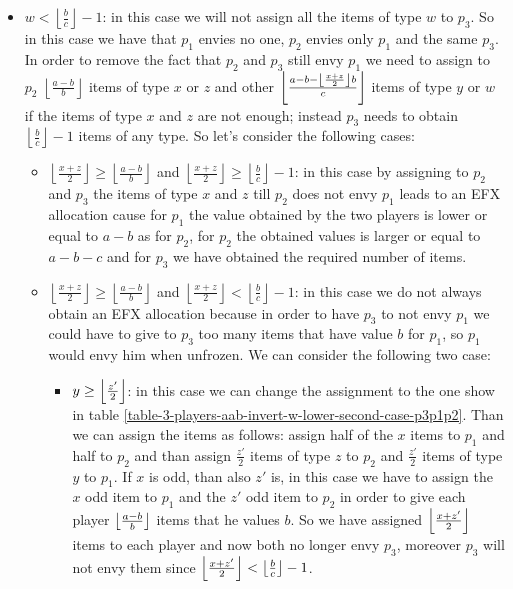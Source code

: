 \begin{itemize}
    \item $w < \left \lfloor \frac{b}{c}\right \rfloor - 1 $: in this case we will not assign all the items of type $w$ to $p_3$. So in this case we have that $p_1$ envies no one, $p_2$ envies only $p_1$ and the same $p_3$. In order to remove the fact that $p_2$ and $p_3$ still envy $p_1$ we need to assign to $p_2$ $\left \lfloor \frac{a-b}{b} \right \rfloor $ items of type $x$ or $z$ and other $\left \lfloor \frac{a-b - \left \lfloor\frac{x+z}{2}\right \rfloor b}{c} \right \rfloor$ items of type $y$ or $w$ if the items of type $x$ and $z$ are not enough; instead $p_3$ needs to obtain $\left\lfloor \frac{b}{c}\right \rfloor -1$ items of any type. So let's consider the following cases:
    \begin{itemize}
        \item $\left \lfloor \frac{x+z}{2} \right \rfloor\ge \left \lfloor \frac{a-b}{b} \right \rfloor$ and $\left \lfloor \frac{x+z}{2} \right \rfloor\ge \left\lfloor \frac{b}{c}\right \rfloor -1 $: in this case by assigning to $p_2$ and $p_3$ the items of type $x$ and $z$ till $p_2$ does not envy $p_1$ leads to an EFX allocation cause for $p_1$ the value obtained by the two players is lower or equal to $a-b$ as for $p_2$, for $p_2$ the obtained values is larger or equal to $a-b-c$ and for $p_3$ we have obtained the required number of items. 
         \item $\left \lfloor \frac{x+z}{2} \right \rfloor\ge \left \lfloor \frac{a-b}{b} \right \rfloor$ and $\left \lfloor \frac{x+z}{2} \right \rfloor< \left\lfloor \frac{b}{c}\right \rfloor -1 $: in this case we do not always obtain an EFX allocation because in order to have $p_3$ to not envy $p_1$ we could have to give to $p_3$ too many items that have value $b$ for $p_1$, so $p_1$ would envy him when unfrozen. 
         We can consider the following two case:
         \begin{itemize}
            \item $y\ge \left \lfloor\frac{z'}{2}\right \rfloor$: in this case we can change the assignment to the one show in table \ref{table-3-players-aab-invert-w-lower-second-case-p3p1p2}. Than we can assign the items as follows: assign half of the $x$ items to $p_1$ and half to $p_2$ and than assign $\frac{z'}{2}$ items of type $z$ to $p_2$ and $\frac{z'}{2}$ items of type $y$ to $p_1$. If $x$ is odd, than also $z'$ is, in this case we have to assign the $x$ odd item to $p_1$ and the $z'$ odd item to $p_2$ in order to give each player $\left \lfloor\frac{a-b}{b}\right \rfloor$ items that he values $b$. So we have assigned $\left \lfloor\frac{x+z'}{2}\right \rfloor$ items to each player and now both no longer envy $p_3$, moreover $p_3$ will not envy them since $\left \lfloor\frac{x+z'}{2}\right \rfloor < \left \lfloor\frac{b}{c}\right \rfloor - 1$.

\end{itemize}
\end{itemize}
\end{itemize}
